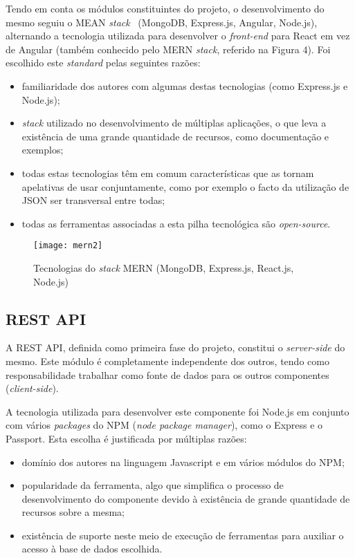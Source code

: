 Tendo em conta os módulos constituintes do projeto, o desenvolvimento do mesmo seguiu o MEAN \textit{stack}~\cite{Williams2017} (MongoDB, Express.js, Angular, Node.js), alternando a tecnologia utilizada para desenvolver o \textit{front-end} para React em vez de Angular (também conhecido pelo MERN \textit{stack}, referido na Figura 4). Foi escolhido este \textit{standard} pelas seguintes razões:
\begin{itemize}
	\item familiaridade dos autores com algumas destas tecnologias (como Express.js e Node.js);
	\item \textit{stack} utilizado no desenvolvimento de múltiplas aplicações, o que leva a existência de uma grande quantidade de recursos, como documentação e exemplos;
	\item todas estas tecnologias têm em comum características que as tornam apelativas de usar conjuntamente, como por exemplo o facto da utilização de JSON ser transversal entre todas;
	\item todas as ferramentas associadas a esta pilha tecnológica são \textit{open-source}.
\end{itemize}

\begin{figure}[h]
	\centering
	\texttt{[image: mern2]}
	\caption{Tecnologias do \textit{stack} MERN (MongoDB, Express.js, React.js, Node.js)~\cite{Cooke2020}}
\end{figure}

\subsection{REST API}
A REST API, definida como primeira fase do projeto, constitui o \textit{server-side} do mesmo. Este módulo é completamente independente dos outros, tendo como responsabilidade trabalhar como fonte de dados para os outros componentes (\textit{client-side}). \par \medskip 

A tecnologia utilizada para desenvolver este componente foi Node.js em conjunto com vários \textit{packages} do NPM (\textit{node package manager}), como o Express e o Passport. Esta escolha é justificada por múltiplas razões:
\begin{itemize}
	\item domínio dos autores na linguagem Javascript e em vários módulos do NPM;
	\item popularidade da ferramenta, algo que simplifica o processo de desenvolvimento do componente devido à existência de grande quantidade de recursos sobre a mesma;
	\item existência de suporte neste meio de execução de ferramentas para auxiliar o acesso à base de dados escolhida.
\end{itemize}
\par \medskip

